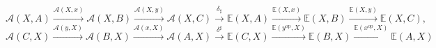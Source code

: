 \documentclass[preview]{standalone}
\begin{document}
\begin{center}
$$\mathscr{A}(X,A) \xrightarrow{\mathscr{A}(X,x)} \mathscr{A}(X,B) \xrightarrow{\mathscr{A}(X,y)} \mathscr{A}(X,C) \xrightarrow{\delta_\sharp} \mathbb{E}(X,A) \xrightarrow{\mathbb{E}(X,x)} \mathbb{E}(X,B) \xrightarrow{\mathbb{E}(X,y)} \mathbb{E}(X,C),$$$$\mathscr{A}(C,X) \xrightarrow{\mathscr{A}(y,X)} \mathscr{A}(B,X) \xrightarrow{\mathscr{A}(x,X)} \mathscr{A}(A,X) \xrightarrow{\delta^\sharp} \mathbb{E}(C,X) \xrightarrow{\mathbb{E}(y^\text{op},X)} \mathbb{E}(B,X) \xrightarrow{\mathbb{E}(x^\text{op},X)} \mathbb{E}(A,X)$$
\end{center}
\end{document}
